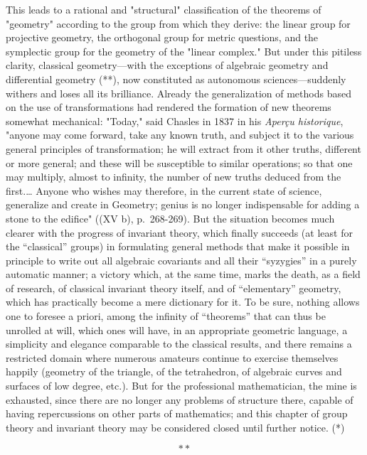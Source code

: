 This leads to a rational and "structural" classification of the theorems of "geometry" according to the group from which they derive: the linear group for projective geometry, the orthogonal group for metric questions, and the symplectic group for the geometry of the "linear complex." But under this pitiless clarity, classical geometry—with the exceptions of algebraic geometry and differential geometry (**), now constituted as autonomous sciences—suddenly withers and loses all its brilliance. Already the generalization of methods based on the use of transformations had rendered the formation of new theorems somewhat mechanical: "Today," said Chasles in 1837 in his \emph{Aperçu historique}, "anyone may come forward, take any known truth, and subject it to the various general principles of transformation; he will extract from it other truths, different or more general; and these will be susceptible to similar operations; so that one may multiply, almost to infinity, the number of new truths deduced from the first.\ldots{} Anyone who wishes may therefore, in the current state of science, generalize and create in Geometry; genius is no longer indispensable for adding a stone to the edifice" ((XV b), p.~268-269). But the situation becomes much clearer with the progress of invariant theory, which finally succeeds (at least for the “classical” groups) in formulating general methods that make it possible in principle to write out all algebraic covariants and all their “syzygies” in a purely automatic manner; a victory which, at the same time, marks the death, as a field of research, of classical invariant theory itself, and of “elementary” geometry, which has practically become a mere dictionary for it. To be sure, nothing allows one to foresee a priori, among the infinity of “theorems” that can thus be unrolled at will, which ones will have, in an appropriate geometric language, a simplicity and elegance comparable to the classical results, and there remains a restricted domain where numerous amateurs continue to exercise themselves happily (geometry of the triangle, of the tetrahedron, of algebraic curves and surfaces of low degree, etc.). But for the professional mathematician, the mine is exhausted, since there are no longer any problems of structure there, capable of having repercussions on other parts of mathematics; and this chapter of group theory and invariant theory may be considered closed until further notice. (*)

\[
\ast \ast
\]

